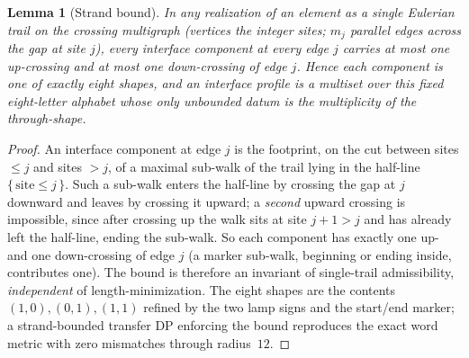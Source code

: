 \documentclass[11pt,a4paper]{article}
\newtheorem{lemma}[theorem]{Lemma}
\theoremstyle{remark}
\theoremstyle{plain}
\begin{document}
\begin{lemma}[Strand bound]
\label{lem:strand-bound}
In any realization of an element as a single Eulerian trail on the
crossing multigraph (vertices the integer sites; $m_j$ parallel edges
across the gap at site $j$), every interface component at every edge $j$
carries at most one up-crossing and at most one down-crossing of edge
$j$.  Hence each component is one of exactly eight shapes, and an
interface profile is a multiset over this fixed eight-letter alphabet
whose only unbounded datum is the multiplicity of the through-shape.
\end{lemma}

\begin{proof}
An interface component at edge $j$ is the footprint, on the cut between
sites $\le j$ and sites $> j$, of a maximal sub-walk of the trail lying in
the half-line $\{\,\text{site} \le j\,\}$.  Such a sub-walk enters the
half-line by crossing the gap at $j$ downward and leaves by crossing it
upward; a \emph{second} upward crossing is impossible, since after
crossing up the walk sits at site $j+1 > j$ and has already left the
half-line, ending the sub-walk.  So each component has exactly one up- and
one down-crossing of edge $j$ (a marker sub-walk, beginning or ending
inside, contributes one).  The bound is therefore an invariant of
single-trail admissibility, \emph{independent} of length-minimization.
The eight shapes are the contents $(1,0), (0,1), (1,1)$ refined by the two
lamp signs and the start/end marker; a strand-bounded transfer DP
enforcing the bound reproduces the exact word metric with zero mismatches
through radius~$12$.
\end{proof}
\end{document}
